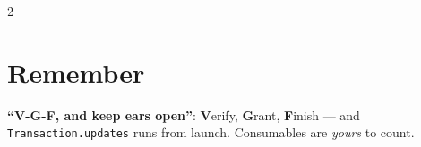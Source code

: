 \documentclass[8pt]{extarticle}
\begin{document}
\begin{multicols}{2}
\section{Remember}
\textbf{``V-G-F, and keep ears open''}: \textbf{V}erify, \textbf{G}rant,
\textbf{F}inish — and \texttt{Transaction.updates} runs from launch.
Consumables are \emph{yours} to count.


\end{multicols}

\end{document}
